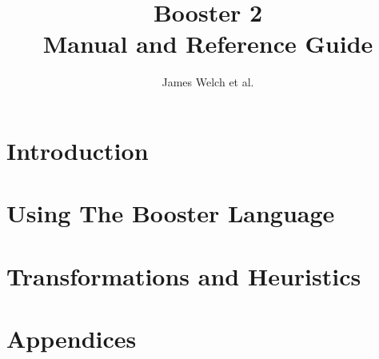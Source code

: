\documentclass[12pt]{ociamthesis}  %
\title{Booster 2\\[1ex]Manual and Reference Guide}   %
\author{James Welch et al.}             %
\begin{document}

\setcounter{secnumdepth}{3}
\setcounter{tocdepth}{3}


\maketitle                  %

\begin{romanpages}          %
\tableofcontents            %
\listoffigures              %
\end{romanpages}            %

\part{Introduction}


\part{Using The Booster Language}

\part{Transformations and Heuristics}

%

\appendix

\part{Appendices}




\end{document}

